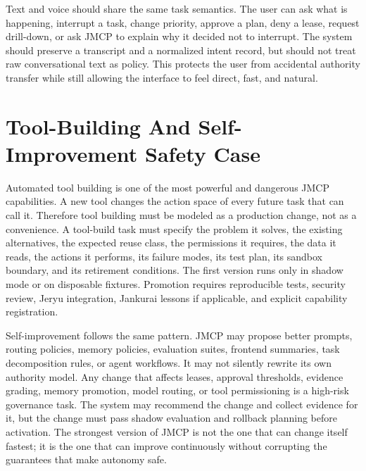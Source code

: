 \documentclass[10pt,journal,onecolumn]{IEEEtran}
\begin{document}
Text and voice should share the same task semantics.  The user can ask what is happening, interrupt a task, change priority, approve a plan, deny a lease, request drill-down, or ask JMCP to explain why it decided not to interrupt.  The system should preserve a transcript and a normalized intent record, but should not treat raw conversational text as policy.  This protects the user from accidental authority transfer while still allowing the interface to feel direct, fast, and natural.

\section{Tool-Building And Self-Improvement Safety Case}
Automated tool building is one of the most powerful and dangerous JMCP capabilities.  A new tool changes the action space of every future task that can call it.  Therefore tool building must be modeled as a production change, not as a convenience.  A tool-build task must specify the problem it solves, the existing alternatives, the expected reuse class, the permissions it requires, the data it reads, the actions it performs, its failure modes, its test plan, its sandbox boundary, and its retirement conditions.  The first version runs only in shadow mode or on disposable fixtures.  Promotion requires reproducible tests, security review, Jeryu integration, Jankurai lessons if applicable, and explicit capability registration.

Self-improvement follows the same pattern.  JMCP may propose better prompts, routing policies, memory policies, evaluation suites, frontend summaries, task decomposition rules, or agent workflows.  It may not silently rewrite its own authority model.  Any change that affects leases, approval thresholds, evidence grading, memory promotion, model routing, or tool permissioning is a high-risk governance task.  The system may recommend the change and collect evidence for it, but the change must pass shadow evaluation and rollback planning before activation.  The strongest version of JMCP is not the one that can change itself fastest; it is the one that can improve continuously without corrupting the guarantees that make autonomy safe.
\end{document}
